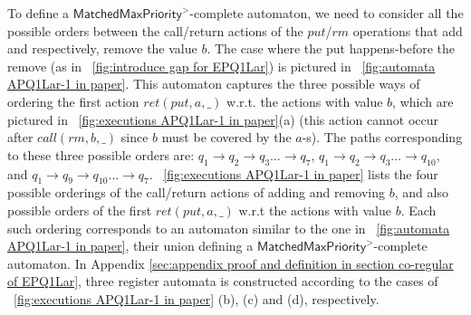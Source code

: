 To define a $\mathsf{MatchedMaxPriority}^>$-complete automaton, we need to consider all the possible orders between the call/return actions of the $\textit{put}$/$\textit{rm}$ operations that add and respectively, remove the value $b$. The case where the put happens-before the remove (as in \figurename~\ref{fig:introduce gap for EPQ1Lar}) is pictured in \figurename~\ref{fig:automata APQ1Lar-1 in paper}. This automaton captures the three possible ways of ordering the first action $\textit{ret}(\textit{put},a,\_)$ w.r.t. the actions with value $b$, which are pictured in \figurename~\ref{fig:executions APQ1Lar-1 in paper}(a) (this action cannot occur after $\textit{call}(\textit{rm},b,\_)$ since $b$ must be covered by the $a$-s). The paths corresponding to these three possible orders are: $q_1 \rightarrow q_2 \rightarrow q_3 \ldots \rightarrow q_7$, $q_1 \rightarrow q_2 \rightarrow q_3 \ldots \rightarrow q_{10}$, and $q_1 \rightarrow q_9 \rightarrow q_{10} \ldots \rightarrow q_7$. \figurename~\ref{fig:executions APQ1Lar-1 in paper} lists the four possible orderings of the call/return actions of adding and removing $b$, and also possible orders of the first $\textit{ret}(\textit{put},a,\_)$ w.r.t the actions with value $b$. Each such ordering corresponds to an automaton similar to the one in \figurename~\ref{fig:automata APQ1Lar-1 in paper}, their union defining a $\mathsf{MatchedMaxPriority}^>$-complete automaton. In Appendix \ref{sec:appendix proof and definition in section co-regular of EPQ1Lar}, three register automata is constructed according to the cases of \figurename~\ref{fig:executions APQ1Lar-1 in paper} (b), (c) and (d), respectively.





